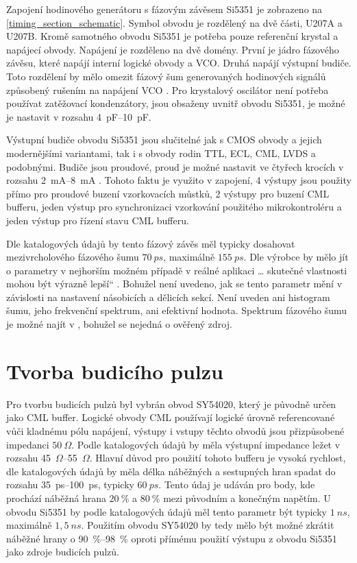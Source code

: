 Zapojení hodinového generátoru s fázovým závěsem Si5351 je zobrazeno na \ref{timing_section_schematic}. Symbol obvodu je rozdělený na dvě části, U207A a U207B. Kromě samotného obvodu Si5351 je potřeba pouze referenční krystal a napájecí obvody. Napájení je rozděleno na dvě domény. První je jádro fázového závěsu, které napájí interní logické obvody a \acrshort{VCO}. Druhá napájí výstupní budiče. Toto rozdělení by mělo omezit fázový šum generovaných hodinových signálů způsobený rušením na napájení \acrshort{VCO} \cite{Si5351applicationnote}. Pro krystalový oscilátor není potřeba používat zatěžovací kondenzátory, jsou obsaženy uvnitř obvodu Si5351, je možné je nastavit v rozsahu \SIrange{4}{10}{\si{pF}}.

Výstupní budiče obvodu Si5351 jsou slučitelné jak s \acrshort{CMOS} obvody a jejich modernějšími variantami, tak i s obvody rodin \acrshort{TTL}, \acrshort{ECL}, \acrshort{CML}, \acrshort{LVDS} a podobnými. Budiče jsou proudové, proud je možné nastavit ve čtyřech krocích v rozsahu \SIrange{2}{8}{\si{mA}} \cite{Si5351datasheet}. Tohoto faktu je využito v zapojení, 4 výstupy jsou použity přímo pro proudové buzení vzorkovacích můstků, 2 výstupy pro buzení \acrshort{CML} bufferu, jeden výstup pro synchronizaci vzorkování použitého mikrokontroléru a jeden výstup pro řízení stavu \acrshort{CML} bufferu.

Dle katalogových údajů by tento fázový závěs měl typicky dosahovat mezivrcholového fázového šumu $70~\si{ps}$, maximálně  $155~\si{ps}$. Dle výrobce by mělo jít o parametry v \quotedblbase nejhorším možném případě v reálné aplikaci \ldots{} skutečné vlastnosti mohou být výrazně lepší\textquotedblleft{} \cite{Si5351datasheet}. Bohužel není uvedeno, jak se tento parametr mění v závislosti na nastavení násobicích a dělicích sekcí. Není uveden ani histogram šumu, jeho frekvenční spektrum, ani efektivní hodnota. Spektrum fázového šumu je možné najít v \cite{Si5351_phase_noise_measurement}, bohužel se nejedná o ověřený zdroj.

\section{Tvorba budicího pulzu}
Pro tvorbu budicích pulzů byl vybrán obvod SY54020, který je původně určen jako \acrshort{CML} buffer. Logické obvody \acrshort{CML} používají logické úrovně referencované vůči kladnému pólu napájení, výstupy i vstupy těchto obvodů jsou přizpůsobené impedanci $50~\Omega$. Podle katalogových údajů \cite{SY54020datasheet} by měla výstupní impedance ležet v rozsahu \SIrange{45}{55}{\si{$\Omega$}}. Hlavní důvod pro použití tohoto bufferu je vysoká rychlost, dle katalogových údajů by měla délka náběžných a sestupných hran spadat do rozsahu \SIrange{35}{100}{\si{ps}}, typicky $60~\si{ps}$. Tento údaj je udáván pro body, kde prochází náběžná hrana $20~\%$ a $80~\%$ mezi původním a konečným napětím. U obvodu Si5351 by podle katalogových údajů měl tento parametr být typicky $1~\si{ns}$, maximálně $1{,}5~\si{ns}$. Použitím obvodu SY54020 by tedy mělo být možné zkrátit náběžné hrany o \SIrange{90}{98}{\si{\%}} oproti přímému použití výstupu z obvodu Si5351 jako zdroje budicích pulzů.

